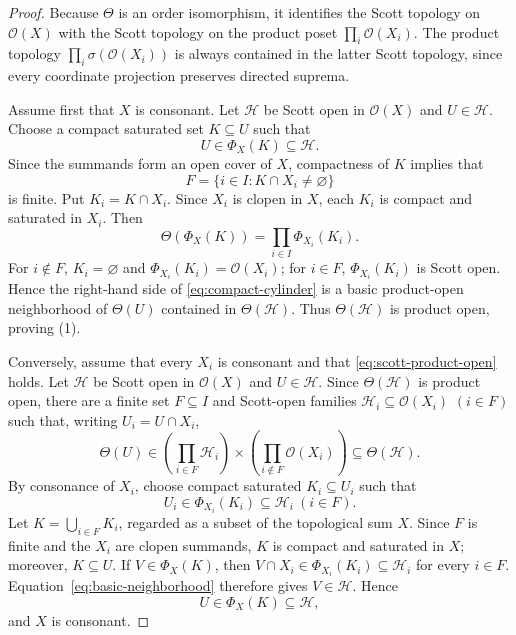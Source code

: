 \documentclass[11pt,reqno]{amsart}
\theoremstyle{definition}
\numberwithin{equation}{section}
\newcommand{\OO}{\mathcal O}
\begin{document}
\begin{proof}
Because $\Theta$ is an order isomorphism, it identifies the Scott topology on
$\OO(X)$ with the Scott topology on the product poset
$\prod_i\OO(X_i)$.  The product topology
$\prod_i\sigma(\OO(X_i))$ is always contained in the latter Scott topology,
since every coordinate projection preserves directed suprema.

Assume first that $X$ is consonant.  Let $\mathcal H$ be Scott open in
$\OO(X)$ and $U\in\mathcal H$.  Choose a compact saturated set $K\subseteq U$
such that
\[
  U\in\Phi_X(K)\subseteq\mathcal H.
\]
Since the summands form an open cover of $X$, compactness of $K$ implies
that
\[
  F=\{i\in I:K\cap X_i\ne\varnothing\}
\]
is finite.  Put $K_i=K\cap X_i$.  Since $X_i$ is clopen in $X$, each $K_i$
is compact and saturated in $X_i$.  Then
\begin{equation}\label{eq:compact-cylinder}
  \Theta(\Phi_X(K))
  =\prod_{i\in I}\Phi_{X_i}(K_i).
\end{equation}
For $i\notin F$, $K_i=\varnothing$ and
$\Phi_{X_i}(K_i)=\OO(X_i)$; for $i\in F$, $\Phi_{X_i}(K_i)$ is Scott
open.  Hence the right-hand side of
\eqref{eq:compact-cylinder} is a basic product-open neighborhood of
$\Theta(U)$ contained in $\Theta(\mathcal H)$.  Thus $\Theta(\mathcal H)$ is
product open, proving (1).

Conversely, assume that every $X_i$ is consonant and that
\eqref{eq:scott-product-open} holds.  Let $\mathcal H$ be Scott open in
$\OO(X)$ and $U\in\mathcal H$.  Since $\Theta(\mathcal H)$ is product open,
there are a finite set $F\subseteq I$ and Scott-open families
$\mathcal H_i\subseteq\OO(X_i)$ $(i\in F)$ such that, writing
$U_i=U\cap X_i$,
\begin{equation}\label{eq:basic-neighborhood}
  \Theta(U)\in
  \left(\prod_{i\in F}\mathcal H_i\right)
  \times\left(\prod_{i\notin F}\OO(X_i)\right)
  \subseteq \Theta(\mathcal H).
\end{equation}
By consonance of $X_i$, choose compact saturated $K_i\subseteq U_i$ such
that
\[
  U_i\in\Phi_{X_i}(K_i)\subseteq\mathcal H_i
  ~ (i\in F).
\]
Let $K=\bigcup_{i\in F}K_i$, regarded as a subset of the topological sum
$X$.  Since $F$ is finite and the $X_i$ are clopen summands, $K$ is compact
and saturated in $X$; moreover, $K\subseteq U$.  If
$V\in\Phi_X(K)$, then $V\cap X_i\in\Phi_{X_i}(K_i)\subseteq\mathcal H_i$
for every $i\in F$.  Equation~\eqref{eq:basic-neighborhood} therefore gives
$V\in\mathcal H$.  Hence
\[
  U\in\Phi_X(K)\subseteq\mathcal H,
\]
and $X$ is consonant.
\end{proof}
\end{document}
